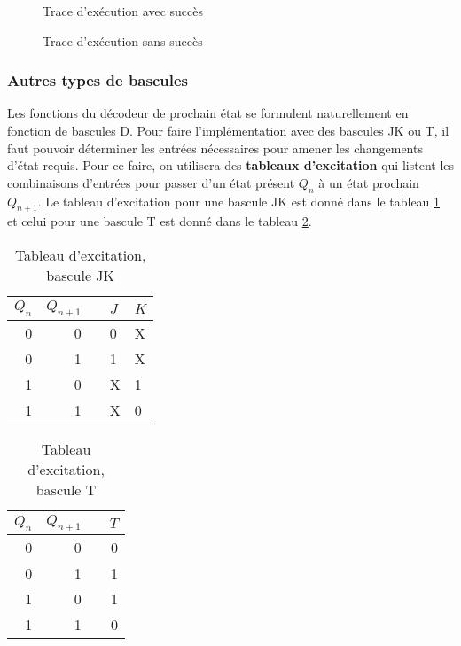 \documentclass[11pt]{article}
\begin{document}
\begin{enumerate}
\begin{figure}[htbp]
\centering

\caption{\label{fig:orgc4ad4f5}Trace d'exécution avec succès}
\end{figure}

\begin{figure}[htbp]
\centering

\caption{\label{fig:org4841d0c}Trace d'exécution sans succès}
\end{figure}
\end{enumerate}

\subsubsection{Autres types de bascules}
\label{sec:orgd2dbf68}

Les fonctions du décodeur de prochain état se formulent naturellement
en fonction de bascules D.  Pour faire l'implémentation avec des
bascules JK ou T, il faut pouvoir déterminer les entrées nécessaires
pour amener les changements d'état requis. Pour ce faire, on
utilisera des \textbf{tableaux d'excitation} qui listent les combinaisons
d'entrées pour passer d'un état présent \(Q_n\) à un état prochain
\(Q_{n+1}\). Le tableau d'excitation pour une bascule JK est donné
dans le tableau \ref{tab:org8a2d2e6} et celui pour une bascule T est donné
dans le tableau \ref{tab:org296aaa3}.

\begin{table}[htbp]
\caption{\label{tab:org8a2d2e6}Tableau d'excitation, bascule JK}
\centering
\begin{tabular}{rrlll}
\(Q_n\) & \(Q_{n+1}\) &  & \(J\) & \(K\)\\[0pt]
\hline
0 & 0 &  & 0 & X\\[0pt]
0 & 1 &  & 1 & X\\[0pt]
1 & 0 &  & X & 1\\[0pt]
1 & 1 &  & X & 0\\[0pt]
\end{tabular}
\end{table}

\begin{table}[htbp]
\caption{\label{tab:org296aaa3}Tableau d'excitation, bascule T}
\centering
\begin{tabular}{rrlr}
\(Q_n\) & \(Q_{n+1}\) &  & \(T\)\\[0pt]
\hline
0 & 0 &  & 0\\[0pt]
0 & 1 &  & 1\\[0pt]
1 & 0 &  & 1\\[0pt]
1 & 1 &  & 0\\[0pt]
\end{tabular}
\end{table}
\end{document}
